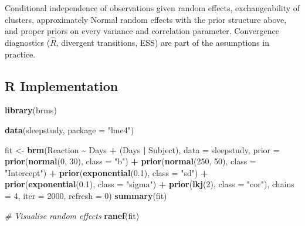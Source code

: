 \documentclass[
]{article}
\newenvironment{Shaded}{\begin{snugshade}}{\end{snugshade}}
\newcommand{\AttributeTok}[1]{\textcolor[rgb]{0.13,0.29,0.53}{#1}}
\newcommand{\CommentTok}[1]{\textcolor[rgb]{0.56,0.35,0.01}{\textit{#1}}}
\newcommand{\DecValTok}[1]{\textcolor[rgb]{0.00,0.00,0.81}{#1}}
\newcommand{\FloatTok}[1]{\textcolor[rgb]{0.00,0.00,0.81}{#1}}
\newcommand{\FunctionTok}[1]{\textcolor[rgb]{0.13,0.29,0.53}{\textbf{#1}}}
\newcommand{\NormalTok}[1]{#1}
\newcommand{\OtherTok}[1]{\textcolor[rgb]{0.56,0.35,0.01}{#1}}
\newcommand{\SpecialCharTok}[1]{\textcolor[rgb]{0.81,0.36,0.00}{\textbf{#1}}}
\newcommand{\StringTok}[1]{\textcolor[rgb]{0.31,0.60,0.02}{#1}}
\begin{document}
Conditional independence of observations given random effects,
exchangeability of clusters, approximately Normal random effects with
the prior structure above, and proper priors on every variance and
correlation parameter. Convergence diagnostics (\(\hat R\), divergent
transitions, ESS) are part of the assumptions in practice.

\subsection{R Implementation}\label{r-implementation}

\begin{Shaded}
\begin{Highlighting}[]
\FunctionTok{library}\NormalTok{(brms)}

\FunctionTok{data}\NormalTok{(sleepstudy, }\AttributeTok{package =} \StringTok{"lme4"}\NormalTok{)}

\NormalTok{fit }\OtherTok{\textless{}{-}} \FunctionTok{brm}\NormalTok{(Reaction }\SpecialCharTok{\textasciitilde{}}\NormalTok{ Days }\SpecialCharTok{+}\NormalTok{ (Days }\SpecialCharTok{|}\NormalTok{ Subject), }\AttributeTok{data =}\NormalTok{ sleepstudy,}
           \AttributeTok{prior =} \FunctionTok{prior}\NormalTok{(}\FunctionTok{normal}\NormalTok{(}\DecValTok{0}\NormalTok{, }\DecValTok{30}\NormalTok{), }\AttributeTok{class =} \StringTok{"b"}\NormalTok{) }\SpecialCharTok{+}
                   \FunctionTok{prior}\NormalTok{(}\FunctionTok{normal}\NormalTok{(}\DecValTok{250}\NormalTok{, }\DecValTok{50}\NormalTok{), }\AttributeTok{class =} \StringTok{"Intercept"}\NormalTok{) }\SpecialCharTok{+}
                   \FunctionTok{prior}\NormalTok{(}\FunctionTok{exponential}\NormalTok{(}\FloatTok{0.1}\NormalTok{), }\AttributeTok{class =} \StringTok{"sd"}\NormalTok{) }\SpecialCharTok{+}
                   \FunctionTok{prior}\NormalTok{(}\FunctionTok{exponential}\NormalTok{(}\FloatTok{0.1}\NormalTok{), }\AttributeTok{class =} \StringTok{"sigma"}\NormalTok{) }\SpecialCharTok{+}
                   \FunctionTok{prior}\NormalTok{(}\FunctionTok{lkj}\NormalTok{(}\DecValTok{2}\NormalTok{), }\AttributeTok{class =} \StringTok{"cor"}\NormalTok{),}
           \AttributeTok{chains =} \DecValTok{4}\NormalTok{, }\AttributeTok{iter =} \DecValTok{2000}\NormalTok{, }\AttributeTok{refresh =} \DecValTok{0}\NormalTok{)}
\FunctionTok{summary}\NormalTok{(fit)}

\CommentTok{\# Visualise random effects}
\FunctionTok{ranef}\NormalTok{(fit)}
\end{Highlighting}
\end{Shaded}
\end{document}
